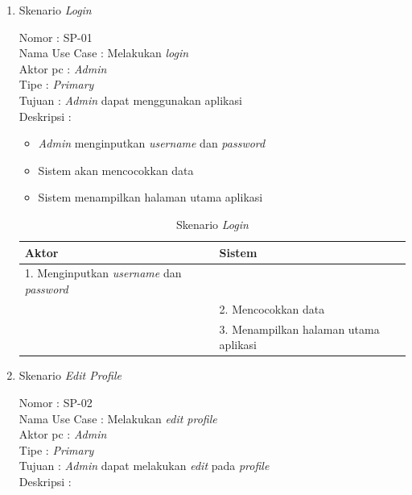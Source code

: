 \begin{enumerate}
	\item Skenario \textit{Login}
	
	Nomor \kern 3.6pc : SP-01 \\
	Nama Use Case : Melakukan \textit{login} \\
	Aktor  pc : \textit{Admin} \\
	Tipe \kern 4.6pc : \textit{Primary} \\
	Tujuan \kern 3.6pc : \textit{Admin} dapat menggunakan aplikasi \\
	Deskripsi \kern 2.5pc : 
	
	\begin{itemize}
		\item \textit{Admin} menginputkan \textit{username} dan \textit{password}
		\item Sistem akan mencocokkan data
		\item Sistem menampilkan halaman utama aplikasi
	\end{itemize}

	\begin{table}
		\caption{Skenario \textit{Login}}
		\centering
		\begin{tabular}{ | p{60mm} | p{68mm} |}
			\hline 
			\textbf{Aktor} & \textbf{Sistem} \\
			\hline
			
			1.	Menginputkan \textit{username} dan \textit{password} &  \\
			
			\hline
			
			& 2. Mencocokkan data \\
			
			\hline
			
			& 3.	Menampilkan halaman utama aplikasi \\
		
			\hline
			
		\end{tabular}
	\end{table}

\item Skenario\textit{ Edit Profile}

Nomor \kern 3.6pc : SP-02 \\
Nama Use Case : Melakukan \textit{edit profile} \\
Aktor  pc : \textit{Admin} \\
Tipe \kern 4.6pc : \textit{Primary} \\
Tujuan \kern 3.6pc : \textit{Admin} dapat melakukan \textit{edit} pada \textit{profile} \\
Deskripsi \kern 2.5pc : 


\end{enumerate}
